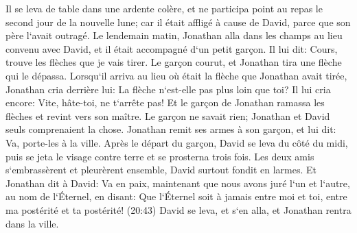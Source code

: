 \verse Il se leva de table dans une ardente colère, et ne participa point au repas le second jour de la nouvelle lune; car il était affligé à cause de David, parce que son père l`avait outragé. 
\verse Le lendemain matin, Jonathan alla dans les champs au lieu convenu avec David, et il était accompagné d`un petit garçon. 
\verse Il lui dit: Cours, trouve les flèches que je vais tirer. Le garçon courut, et Jonathan tira une flèche qui le dépassa. 
\verse Lorsqu`il arriva au lieu où était la flèche que Jonathan avait tirée, Jonathan cria derrière lui: La flèche n`est-elle pas plus loin que toi? 
\verse Il lui cria encore: Vite, hâte-toi, ne t`arrête pas! Et le garçon de Jonathan ramassa les flèches et revint vers son maître. 
\verse Le garçon ne savait rien; Jonathan et David seuls comprenaient la chose. 
\verse Jonathan remit ses armes à son garçon, et lui dit: Va, porte-les à la ville. 
\verse Après le départ du garçon, David se leva du côté du midi, puis se jeta le visage contre terre et se prosterna trois fois. Les deux amis s`embrassèrent et pleurèrent ensemble, David surtout fondit en larmes. 
\verse Et Jonathan dit à David: Va en paix, maintenant que nous avons juré l`un et l`autre, au nom de l`Éternel, en disant: Que l`Éternel soit à jamais entre moi et toi, entre ma postérité et ta postérité! (20:43) David se leva, et s`en alla, et Jonathan rentra dans la ville. 

\chapter{}

